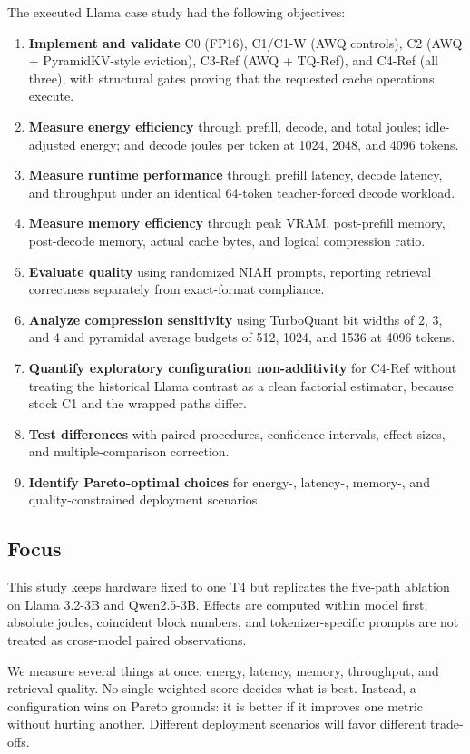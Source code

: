 \documentclass[conference]{IEEEtran}
\begin{document}
The executed Llama case study had the following objectives:
\begin{enumerate}
  \item \textbf{Implement and validate} C0 (FP16), C1/C1-W (AWQ controls), C2 (AWQ + PyramidKV-style eviction), C3-Ref (AWQ + TQ-Ref), and C4-Ref (all three), with structural gates proving that the requested cache operations execute.
  \item \textbf{Measure energy efficiency} through prefill, decode, and total joules; idle-adjusted energy; and decode joules per token at 1024, 2048, and 4096 tokens.
  \item \textbf{Measure runtime performance} through prefill latency, decode latency, and throughput under an identical 64-token teacher-forced decode workload.
  \item \textbf{Measure memory efficiency} through peak VRAM, post-prefill memory, post-decode memory, actual cache bytes, and logical compression ratio.
  \item \textbf{Evaluate quality} using randomized NIAH prompts, reporting retrieval correctness separately from exact-format compliance.
  \item \textbf{Analyze compression sensitivity} using TurboQuant bit widths of 2, 3, and 4 and pyramidal average budgets of 512, 1024, and 1536 at 4096 tokens.
  \item \textbf{Quantify exploratory configuration non-additivity} for C4-Ref without treating the historical Llama contrast as a clean factorial estimator, because stock C1 and the wrapped paths differ.
  \item \textbf{Test differences} with paired procedures, confidence intervals, effect sizes, and multiple-comparison correction.
  \item \textbf{Identify Pareto-optimal choices} for energy-, latency-, memory-, and quality-constrained deployment scenarios.
\end{enumerate}

\subsection{Focus}

This study keeps hardware fixed to one T4 but replicates the five-path ablation on Llama 3.2-3B and Qwen2.5-3B. Effects are computed within model first; absolute joules, coincident block numbers, and tokenizer-specific prompts are not treated as cross-model paired observations.

We measure several things at once: energy, latency, memory, throughput, and retrieval quality. No single weighted score decides what is best. Instead, a configuration wins on Pareto grounds: it is better if it improves one metric without hurting another. Different deployment scenarios will favor different trade-offs.
\end{document}
